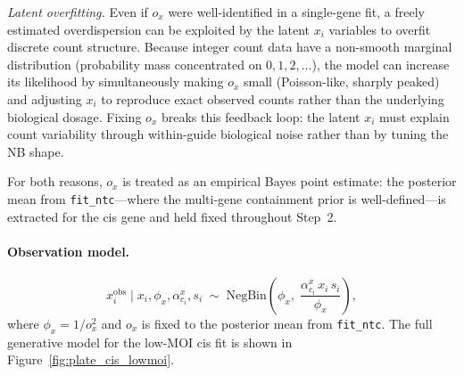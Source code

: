 \documentclass[12pt]{article}
\newcommand{\NB}{\mathrm{NegBin}}
\newcommand{\given}{\mid}
\begin{document}
\textit{Latent overfitting.}
Even if $o_x$ were well-identified in a single-gene fit, a freely estimated overdispersion
can be exploited by the latent $x_i$ variables to overfit discrete count structure.
Because integer count data have a non-smooth marginal distribution (probability mass
concentrated on $0, 1, 2, \ldots$), the model can increase its likelihood by
simultaneously making $o_x$ small (Poisson-like, sharply peaked) and adjusting $x_i$
to reproduce exact observed counts rather than the underlying biological dosage.
Fixing $o_x$ breaks this feedback loop: the latent $x_i$ must explain count variability
through within-guide biological noise rather than by tuning the NB shape.

For both reasons, $o_x$ is treated as an empirical Bayes point estimate: the posterior
mean from \texttt{fit\_ntc}—where the multi-gene containment prior is well-defined—is
extracted for the cis gene and held fixed throughout Step~2.

\paragraph{Observation model.}

\begin{equation}
  x_i^{\mathrm{obs}} \given x_i, \phi_x, \alpha_{c_i}^x, s_i
    \;\sim\; \NB\!\left(\phi_x,\; \frac{\alpha_{c_i}^x \, x_i \, s_i}{\phi_x}\right),
    \label{eq:cis_obs}
\end{equation}
%
where $\phi_x = 1/o_x^2$ and $o_x$ is fixed to the posterior mean from \texttt{fit\_ntc}.
The full generative model for the low-MOI cis fit is shown in Figure~\ref{fig:plate_cis_lowmoi}.
\end{document}
